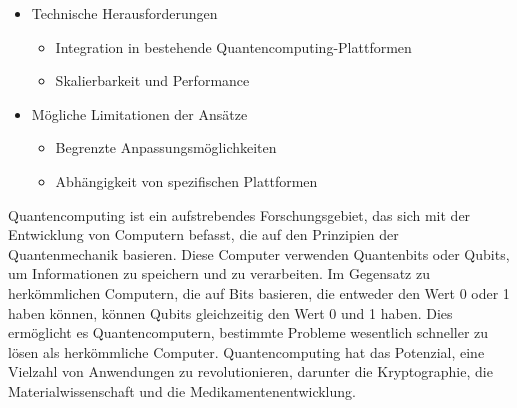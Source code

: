 \begin{itemize}
        \begin{itemize}
            \item Technische Herausforderungen
                \begin{itemize}
                    \item Integration in bestehende Quantencomputing-Plattformen
                    \item Skalierbarkeit und Performance
                \end{itemize}
            \item Mögliche Limitationen der Ansätze
                \begin{itemize}
                    \item Begrenzte Anpassungsmöglichkeiten
                    \item Abhängigkeit von spezifischen Plattformen
                \end{itemize}
        \end{itemize}
\end{itemize}

Quantencomputing ist ein aufstrebendes Forschungsgebiet, das sich mit der Entwicklung von
Computern befasst, die auf den Prinzipien der Quantenmechanik basieren. Diese Computer
verwenden Quantenbits oder Qubits, um Informationen zu speichern und zu verarbeiten. Im
Gegensatz zu herkömmlichen Computern, die auf Bits basieren, die entweder den Wert 0 oder
1 haben können, können Qubits gleichzeitig den Wert 0 und 1 haben. Dies ermöglicht es
Quantencomputern, bestimmte Probleme wesentlich schneller zu lösen als herkömmliche
Computer. Quantencomputing hat das Potenzial, eine Vielzahl von Anwendungen zu
revolutionieren, darunter die Kryptographie, die Materialwissenschaft und die
Medikamentenentwicklung.

